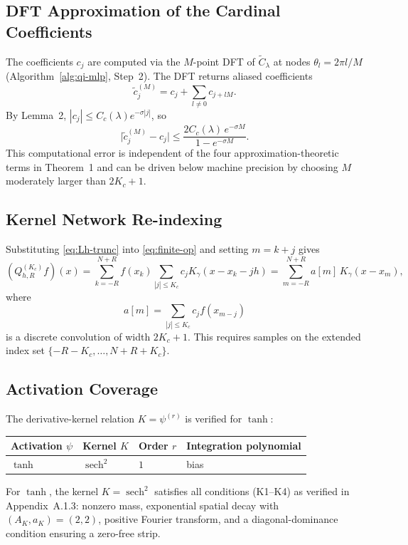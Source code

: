 \documentclass{article}
\begin{document}
\subsection{DFT Approximation of the Cardinal Coefficients}
\label{app:dft-approximation}

The coefficients \(c_j\) are computed via the \(M\)-point DFT of \(\widetilde{C}_\lambda\) at nodes \(\theta_l = 2\pi l/M\) (Algorithm~\ref{alg:qi-mlp}, Step~2). The DFT returns aliased coefficients
\[
\widetilde{c}_j^{(M)} = c_j + \sum_{l \neq 0} c_{j+lM}.
\]
By Lemma~2, \(|c_j| \leq C_c(\lambda)e^{-\sigma|j|}\), so
\[
\bigl|\widetilde{c}_j^{(M)} - c_j\bigr|
\leq
\frac{2C_c(\lambda)\, e^{-\sigma M}}{1 - e^{-\sigma M}}.
\]
This computational error is independent of the four approximation-theoretic terms in Theorem~1 and can be driven below machine precision by choosing \(M\) moderately larger than \(2K_c + 1\).

\subsection{Kernel Network Re-indexing}
\label{app:kernel-reindexing}

Substituting \eqref{eq:Lh-trunc} into \eqref{eq:finite-op} and setting \(m = k + j\) gives
\[
(Q_{h,R}^{(K_c)} f)(x)
=
\sum_{k=-R}^{N+R} f(x_k)\sum_{|j| \le K_c} c_j K_\gamma(x - x_k - jh)
=
\sum_{m=-R}^{N+R} a[m]\, K_\gamma(x - x_m),
\]
where
\[
a[m] = \sum_{|j| \le K_c} c_j f(x_{m-j})
\]
is a discrete convolution of width \(2K_c + 1\). This requires samples on the extended index set \(\{-R-K_c, \ldots, N+R+K_c\}\).

\subsection{Activation Coverage}
\label{app:activation-coverage}

The derivative-kernel relation \(K = \psi^{(r)}\) is verified for \(\tanh\):

\begin{center}
\small
\begin{tabular}{@{}llll@{}}
\toprule
Activation \(\psi\) & Kernel \(K\) & Order \(r\) & Integration polynomial \\
\midrule
\(\tanh\) & \(\operatorname{sech}^2\) & \(1\) & bias \\
\bottomrule
\end{tabular}
\end{center}

For \(\tanh\), the kernel \(K = \operatorname{sech}^2\) satisfies all conditions (K1--K4) as verified in Appendix~A.1.3: nonzero mass, exponential spatial decay with \((A_K, a_K) = (2,2)\), positive Fourier transform, and a diagonal-dominance condition ensuring a zero-free strip.
\end{document}
